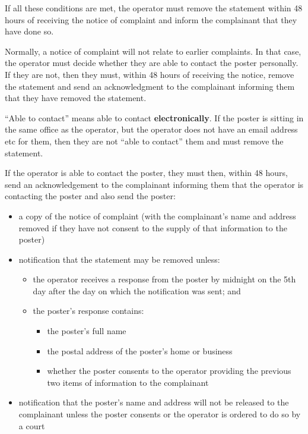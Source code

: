 \documentclass[]{article}
\begin{document}
If all these conditions are met, the operator must remove the statement within 48 hours of receiving the notice of complaint and inform the complainant that they have done so.

Normally, a notice of complaint will not relate to earlier complaints. In that case, the operator must decide whether they are able to contact the poster personally. If they are not, then they must, within 48 hours of receiving the notice, remove the statement and send an acknowledgment to the complainant informing them that they have removed the statement.

``Able to contact'' means able to contact {\bf electronically}. If the poster is sitting in the same office as the operator, but the operator does not have an email address etc for them, then they are not ``able to contact'' them and must remove the statement.

If the operator is able to contact the poster, they must then, within 48 hours, send an acknowledgement to the complainant informing them that the operator is contacting the poster and also send the poster:

\begin{itemize}
\item a copy of the notice of complaint (with the complainant's name and address removed if they have not consent to the supply of that information to the poster)
\item notification that the statement may be removed unless:
  \begin{itemize}
  \item the operator receives a response from the poster by midnight on the 5th day after the day on which the notification was sent; and
  \item the poster's response contains:
    \begin{itemize}
    \item the poster's full name
    \item the postal address of the poster's home or business
    \item whether the poster consents to the operator providing the previous two items of information to the complainant
    \end{itemize}
  \end{itemize}
\item notification that the poster's name and address will not be released to the complainant unless the poster consents or the operator is ordered to do so by a court
\end{itemize}
\end{document}
